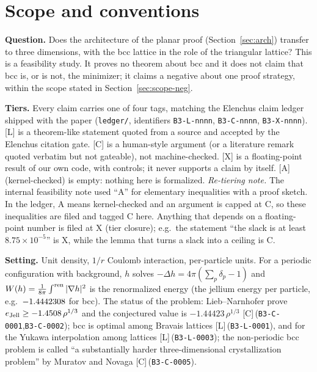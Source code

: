 \documentclass[10pt]{article}
\newcommand{\tier}[1]{\textsf{[#1]}}
\newcommand{\cid}[1]{\texttt{B3-#1}}
\theoremstyle{remark}
\begin{document}
\section{Scope and conventions}\label{sec:scope}
\textbf{Question.} Does the architecture of the planar proof (Section~\ref{sec:arch}) transfer to three dimensions, with the bcc lattice in the
role of the triangular lattice? This is a feasibility study. It proves no theorem about bcc and it does not claim that bcc is, or is not, the
minimizer; it claims a negative about one proof strategy, within the scope stated in Section~\ref{sec:scope-neg}.

\textbf{Tiers.} Every claim carries one of four tags, matching the Elenchus claim ledger shipped with the paper
(\texttt{ledger/}, identifiers \cid{L-nnnn}, \cid{C-nnnn}, \cid{X-nnnn}).
\tier{L} is a theorem-like statement quoted from a source and accepted by the Elenchus citation gate.
\tier{C} is a human-style argument (or a literature remark quoted verbatim but not gateable), not machine-checked.
\tier{X} is a floating-point result of our own code, with controls; it never supports a claim by itself.
\tier{A} (kernel-checked) is empty: nothing here is formalized.
\emph{Re-tiering note.} The internal feasibility note used ``A'' for elementary inequalities with a proof sketch. In the ledger, A means
kernel-checked and an argument is capped at C, so these inequalities are filed and tagged C here. Anything that depends on a floating-point
number is filed at X (tier closure); e.g.\ the statement ``the slack is at least $8.75\times10^{-5}$'' is X, while the lemma that turns a
slack into a ceiling is C.

\textbf{Setting.} Unit density, $1/r$ Coulomb interaction, per-particle units. For a periodic configuration with background, $h$ solves
$-\Delta h=4\pi(\sum_p\delta_p-1)$ and $W(h)=\frac1{8\pi}\int^{\rm ren}|\nabla h|^2$ is the renormalized energy (the jellium energy per particle, e.g.\ $-1.4442308$ for bcc). The status of the problem: Lieb--Narnhofer prove
$e_{\rm Jell}\ge-1.4508\,\rho^{1/3}$ and the conjectured value is $-1.44423\,\rho^{1/3}$ \tier{C}\,(\cid{C-0001},\cid{C-0002}); bcc is optimal among
Bravais lattices \tier{L}\,(\cid{L-0001}), and for the Yukawa interpolation among lattices \tier{L}\,(\cid{L-0003}); the non-periodic bcc problem is called ``a
substantially harder three-dimensional crystallization problem'' by Muratov and Novaga \tier{C}\,(\cid{C-0005}).
\end{document}
